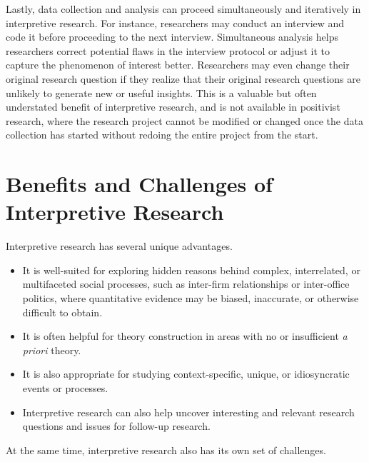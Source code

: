 Lastly, data collection and analysis can proceed simultaneously and iteratively in interpretive research. For instance, researchers may conduct an interview and code it before proceeding to the next interview. Simultaneous analysis helps researchers correct potential flaws in the interview protocol or adjust it to capture the phenomenon of interest better. Researchers may even change their original research question if they realize that their original research questions are unlikely to generate new or useful insights. This is a valuable but often understated benefit of interpretive research, and is not available in positivist research, where the research project cannot be modified or changed once the data collection has started without redoing the entire project from the start.

\section{Benefits and Challenges of Interpretive Research}

Interpretive research has several unique advantages. 

\begin{itemize}
	\item It is well-suited for exploring hidden reasons behind complex, interrelated, or multifaceted social processes, such as inter-firm relationships or inter-office politics, where quantitative evidence may be biased, inaccurate, or otherwise difficult to obtain.

	\item It is often helpful for theory construction in areas with no or insufficient \textit{a priori} theory.
	
	\item It is also appropriate for studying context-specific, unique, or idiosyncratic events or processes.
	
	\item Interpretive research can also help uncover interesting and relevant research questions and issues for follow-up research.

\end{itemize}
At the same time, interpretive research also has its own set of challenges.

